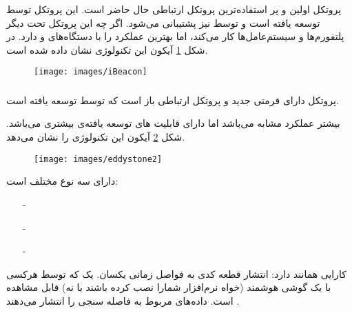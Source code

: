 \documentclass[oneside]{report}
\begin{document}
	\subsubsection{{\small {}} }
	پروتکل
			{\normalsize {}} 
اولین و پر استفاده‌ترین پروتکل ارتباطی حال حاضر است. این پروتکل توسط 
		{\normalsize {}} 
		توسعه یافته است و توسط 
				{\normalsize {}} 
نیز پشتیبانی می‌شود. اگر چه این پروتکل تحت دیگر پلتفورم‌ها و سیستم‌عامل‌ها کار می‌کند، اما بهترین عملکرد را با دستگاه‌های 
		{\normalsize {}} 
		و 
				{\normalsize {}} 
				دارد. 				در شکل 
				\ref{fig:ibeacon}
آیکون این تکنولوژی نشان داده شده است.
	\begin{figure}[h]
		\centering
		\texttt{[image: images/iBeacon]}
		\caption{{\small {}} }
		\label{fig:ibeacon}
	\end{figure}
	
	
		
	\subsubsection{{\small {}} }	
پروتکل 
		{\normalsize {}} 
 دارای فرمتی جدید و پروتکل ارتباطی باز است که توسط 
 		{\normalsize {}} 
 		توسعه یافته است. 
	
		بیشتر عملکرد 
				{\normalsize {}} 
				مشابه 
						{\normalsize {}} 
						می‌باشد اما دارای قابلیت های توسعه یافته‌ی بیشتری می‌باشد. 
		شکل 
	\ref{fig:eddystone2}
	آیکون این تکنولوژی را نشان می‌دهد.
						\begin{figure}[h]
							\centering
							\texttt{[image: images/eddystone2]}
							\caption{{\small {}} }
							\label{fig:eddystone2}
						\end{figure}
			{\normalsize {}} 
			دارای سه نوع مختلف است: 
	\begin{itemize}
		\item[-] 				{\normalsize {}} 
		\item[-] 				{\normalsize {}} 
		\item[-] 				{\normalsize {}} 
	\end{itemize}
	{\normalsize {}} 
	کارایی همانند 
	 		{\normalsize {}} 
	 		دارد: انتشار قطعه کدی به فواصل زمانی یکسان. 
		{\normalsize {}}
		یک 
			{\normalsize {}} 
			که توسط هرکسی با یک گوشی هوشمند   (خواه نرم‌افزار شمارا نصب کرده باشند یا نه) قابل مشاهده است. 
			{\normalsize {}}
داده‌های مربوط به فاصله سنجی را انتشار می‌دهند
\cite{kontakt}.
\end{document}
